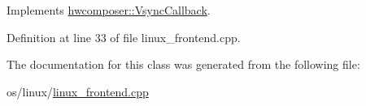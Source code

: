 Implements \mbox{\hyperlink{classhwcomposer_1_1VsyncCallback_a632ac6a2e13e1b387df9508507a2ed4d}{hwcomposer\+::\+Vsync\+Callback}}.



Definition at line 33 of file linux\+\_\+frontend.\+cpp.


\begin{DoxyCode}{0}
\end{DoxyCode}


The documentation for this class was generated from the following file\+:\begin{DoxyCompactItemize}
\item 
os/linux/\mbox{\hyperlink{linux__frontend_8cpp}{linux\+\_\+frontend.\+cpp}}\end{DoxyCompactItemize}
